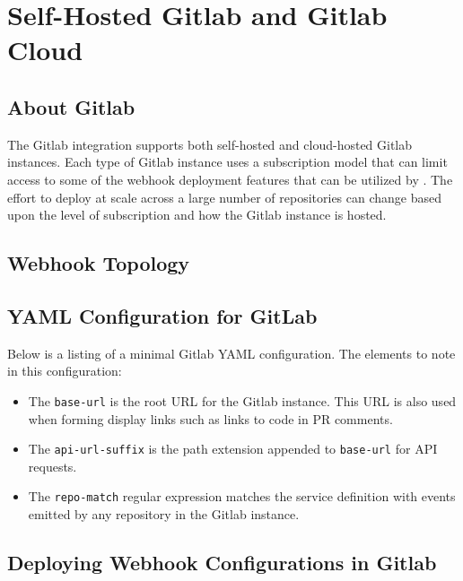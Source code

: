 \chapter{Self-Hosted Gitlab and Gitlab Cloud}


\section{About Gitlab}

The Gitlab integration supports both self-hosted and cloud-hosted Gitlab instances.  Each type
of Gitlab instance uses a subscription model that can limit access to some of the webhook
deployment features that can be utilized by \cxoneflowns. The effort to deploy \cxoneflow at scale
across a large number of repositories can change based upon the level of subscription
and how the Gitlab instance is hosted.

\section{Webhook Topology}




\section{\cxoneflowtext\space YAML Configuration for GitLab}

Below is a listing of a minimal Gitlab YAML configuration.  The elements to note in this
configuration:

\begin{itemize}
    \item The \texttt{base-url} is the root URL for the Gitlab instance.  This URL is also used
    when forming display links such as links to code in PR comments.
    \item The \texttt{api-url-suffix} is the path extension appended to \texttt{base-url} for API requests.
    \item The \texttt{repo-match} regular expression matches the service definition with events emitted by any repository
    in the Gitlab instance.
\end{itemize}



\section{Deploying Webhook Configurations in Gitlab}

